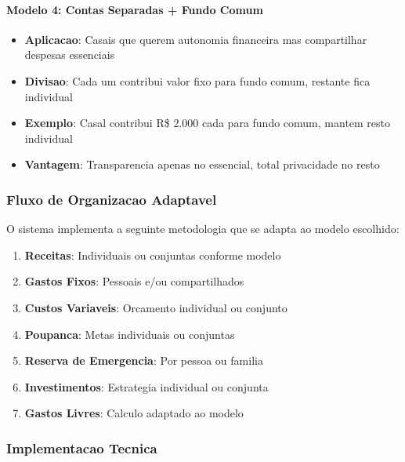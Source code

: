 \paragraph{Modelo 4: Contas Separadas + Fundo Comum}
\begin{itemize}
    \item \textbf{Aplicacao}: Casais que querem autonomia financeira mas compartilhar despesas essenciais
    \item \textbf{Divisao}: Cada um contribui valor fixo para fundo comum, restante fica individual
    \item \textbf{Exemplo}: Casal contribui R\$ 2.000 cada para fundo comum, mantem resto individual
    \item \textbf{Vantagem}: Transparencia apenas no essencial, total privacidade no resto
\end{itemize}

\subsubsection{Fluxo de Organizacao Adaptavel}
O sistema implementa a seguinte metodologia que se adapta ao modelo escolhido:

\begin{enumerate}
    \item \textbf{Receitas}: Individuais ou conjuntas conforme modelo
    \item \textbf{Gastos Fixos}: Pessoais e/ou compartilhados
    \item \textbf{Custos Variaveis}: Orcamento individual ou conjunto
    \item \textbf{Poupanca}: Metas individuais ou conjuntas
    \item \textbf{Reserva de Emergencia}: Por pessoa ou familia
    \item \textbf{Investimentos}: Estrategia individual ou conjunta
    \item \textbf{Gastos Livres}: Calculo adaptado ao modelo
\end{enumerate}

\subsubsection{Implementacao Tecnica}

